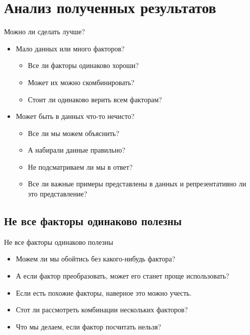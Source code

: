 \documentclass[14pt, fleqn, xcolor={dvipsnames, table}, hyperref={unicode}, babel={english,russian}, inputenc=utf8x]{beamer}
\begin{document}
\section{Анализ полученных результатов}
\begin{frame}{Можно ли сделать лучше?}
\begin{itemize}
  \item Мало данных или много факторов?
  \begin{itemize}
    \item Все ли факторы одинаково хороши?
    \item Может их можно скомбинировать?
    \item Стоит ли одинаково верить всем факторам?
  \end{itemize}
  \item Может быть в данных что-то нечисто?
  \begin{itemize}
    \item Все ли мы можем объяснить?
    \item А набирали данные правильно?
    \item Не подсматриваем ли мы в ответ?
    \item Все ли важные примеры представлены в данных и репрезентативно ли это представление?
  \end{itemize}
\end{itemize}
\end{frame}

\subsection{Не все факторы одинаково полезны}
\begin{frame}{Не все факторы одинаково полезны}
\begin{itemize}
  \item Можем ли мы обойтись без какого-нибудь фактора?
  \item А если фактор преобразовать, может его станет проще использовать?
  \item Если есть похожие факторы, наверное это можно учесть.
  \item Стот ли рассмотреть комбинации нескольких факторов?
  \item Что мы делаем, если фактор посчитать нельзя?
\end{itemize}
\end{frame}
\end{document}

